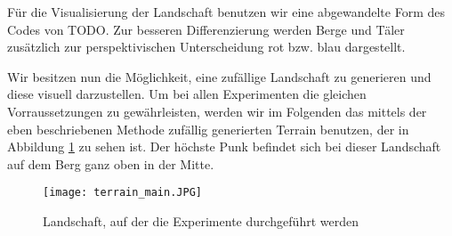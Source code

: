 Für die Visualisierung der Landschaft benutzen wir eine abgewandelte Form des Codes von TODO. Zur besseren Differenzierung werden Berge und Täler zusätzlich zur perspektivischen Unterscheidung rot bzw. blau dargestellt.

\smallspace

Wir besitzen nun die Möglichkeit, eine zufällige Landschaft zu generieren und diese visuell darzustellen. Um bei allen Experimenten die gleichen Vorraussetzungen zu gewährleisten, werden wir im Folgenden das mittels der eben beschriebenen Methode zufällig generierten Terrain benutzen, der in Abbildung \ref{img:terrainMain} zu sehen ist. Der höchste Punk befindet sich bei dieser Landschaft auf dem Berg ganz oben in der Mitte.

\begin{figure}[H]
    \centering
    \texttt{[image: terrain\_main.JPG]}
    \caption{Landschaft, auf der die Experimente durchgeführt werden} \label{img:terrainMain}
\end{figure}